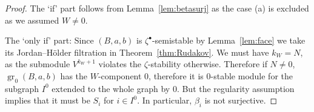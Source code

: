 \documentclass[10pt,a4paper]{amsart}
\theoremstyle{definition}
\numberwithin{equation}{section}
\newcommand{\thmref}[1]{Theorem~\ref{#1}}
\newcommand{\lemref}[1]{Lemma~\ref{#1}}
\newcommand{\gr}{\operatorname{gr}} %
\begin{document}
\begin{proof}
The `if' part follows from \lemref{lem:betasurj} as the case (a) is
excluded as we assumed $W\neq 0$.

The `only if' part: Since $(B,a,b)$ is $\zeta^\bullet$-semistable by
\lemref{lem:face} we take its Jordan--H\"older f\/iltration in
\thmref{thm:Rudakov}. We must have $k_W = N$, as the submodule
$V^{k_W+1}$ violates the $\zeta$-stability otherwise. Therefore if $N
\neq 0$, $\gr_0(B,a,b)$ has the $W$-component $0$, therefore it is
$0$-stable module for the subgraph $I^0$ extended to the whole graph
by $0$. But the regularity assumption implies that it must be $S_i$
for $i\in I^0$. In particular, $\beta_i$ is not surjective.
\end{proof}
\end{document}
